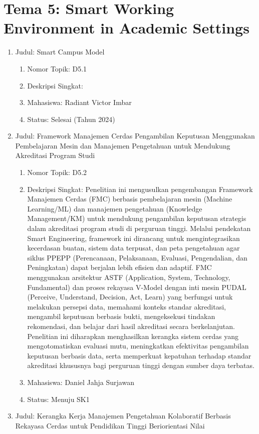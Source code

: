 \documentclass[
  letterpaper,
  DIV=11,
  numbers=noendperiod]{scrreprt}
\providecommand{\tightlist}{%
  \setlength{\itemsep}{0pt}\setlength{\parskip}{0pt}}
\begin{document}
\section{Tema 5: Smart Working Environment in Academic
Settings}\label{tema-5-smart-working-environment-in-academic-settings-1}

\begin{enumerate}
\def\labelenumi{\arabic{enumi}.}
\tightlist
\item
  Judul: Smart Campus Model

  \begin{enumerate}
  \def\labelenumii{\arabic{enumii}.}
  \tightlist
  \item
    Nomor Topik: D5.1
  \item
    Deskripsi Singkat:
  \item
    Mahasiswa: Radiant Victor Imbar
  \item
    Status: Selesai (Tahun 2024)
  \end{enumerate}
\item
  Judul: Framework Manajemen Cerdas Pengambilan Keputusan Menggunakan
  Pembelajaran Mesin dan Manajemen Pengetahuan untuk Mendukung
  Akreditasi Program Studi

  \begin{enumerate}
  \def\labelenumii{\arabic{enumii}.}
  \tightlist
  \item
    Nomor Topik: D5.2
  \item
    Deskripsi Singkat: Penelitian ini mengusulkan pengembangan Framework
    Manajemen Cerdas (FMC) berbasis pembelajaran mesin (Machine
    Learning/ML) dan manajemen pengetahuan (Knowledge Management/KM)
    untuk mendukung pengambilan keputusan strategis dalam akreditasi
    program studi di perguruan tinggi. Melalui pendekatan Smart
    Engineering, framework ini dirancang untuk mengintegrasikan
    kecerdasan buatan, sistem data terpusat, dan peta pengetahuan agar
    siklus PPEPP (Perencanaan, Pelaksanaan, Evaluasi, Pengendalian, dan
    Peningkatan) dapat berjalan lebih efisien dan adaptif. FMC
    menggunakan arsitektur ASTF (Application, System, Technology,
    Fundamental) dan proses rekayasa V-Model dengan inti mesin PUDAL
    (Perceive, Understand, Decision, Act, Learn) yang berfungsi untuk
    melakukan persepsi data, memahami konteks standar akreditasi,
    mengambil keputusan berbasis bukti, mengeksekusi tindakan
    rekomendasi, dan belajar dari hasil akreditasi secara berkelanjutan.
    Penelitian ini diharapkan menghasilkan kerangka sistem cerdas yang
    mengotomatiskan evaluasi mutu, meningkatkan efektivitas pengambilan
    keputusan berbasis data, serta memperkuat kepatuhan terhadap standar
    akreditasi khususnya bagi perguruan tinggi dengan sumber daya
    terbatas.
  \item
    Mahasiswa: Daniel Jahja Surjawan
  \item
    Status: Menuju SK1
  \end{enumerate}
\item
  Judul: Kerangka Kerja Manajemen Pengetahuan Kolaboratif Berbasis
  Rekayasa Cerdas untuk Pendidikan Tinggi Beriorientasi Nilai


\end{enumerate}
\end{document}
